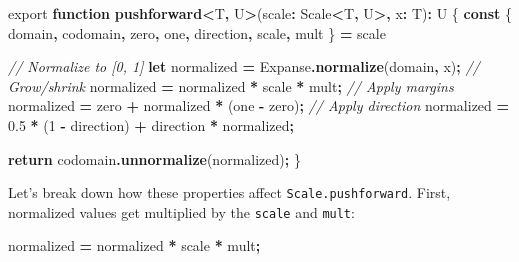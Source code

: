 \documentclass[
  openany]{book}
\newenvironment{Shaded}{\begin{snugshade}}{\end{snugshade}}
\newcommand{\CommentTok}[1]{\textcolor[rgb]{0.56,0.35,0.01}{\textit{#1}}}
\newcommand{\ControlFlowTok}[1]{\textcolor[rgb]{0.13,0.29,0.53}{\textbf{#1}}}
\newcommand{\DecValTok}[1]{\textcolor[rgb]{0.00,0.00,0.81}{#1}}
\newcommand{\FloatTok}[1]{\textcolor[rgb]{0.00,0.00,0.81}{#1}}
\newcommand{\FunctionTok}[1]{\textcolor[rgb]{0.13,0.29,0.53}{\textbf{#1}}}
\newcommand{\ImportTok}[1]{#1}
\newcommand{\KeywordTok}[1]{\textcolor[rgb]{0.13,0.29,0.53}{\textbf{#1}}}
\newcommand{\NormalTok}[1]{#1}
\newcommand{\OperatorTok}[1]{\textcolor[rgb]{0.81,0.36,0.00}{\textbf{#1}}}
\theoremstyle{definition}
\theoremstyle{definition}
\theoremstyle{definition}
\theoremstyle{definition}
\theoremstyle{remark}
\begin{document}
\begin{Shaded}
\begin{Highlighting}[]
\ImportTok{export} \KeywordTok{function} \FunctionTok{pushforward}\OperatorTok{\textless{}}\NormalTok{T}\OperatorTok{,}\NormalTok{ U}\OperatorTok{\textgreater{}}\NormalTok{(scale}\OperatorTok{:}\NormalTok{ Scale}\OperatorTok{\textless{}}\NormalTok{T}\OperatorTok{,}\NormalTok{ U}\OperatorTok{\textgreater{},}\NormalTok{ x}\OperatorTok{:}\NormalTok{ T)}\OperatorTok{:}\NormalTok{ U \{}
  \KeywordTok{const}\NormalTok{ \{ domain}\OperatorTok{,}\NormalTok{ codomain}\OperatorTok{,}\NormalTok{ zero}\OperatorTok{,}\NormalTok{ one}\OperatorTok{,}\NormalTok{ direction}\OperatorTok{,}\NormalTok{ scale}\OperatorTok{,}\NormalTok{ mult \} }\OperatorTok{=}\NormalTok{ scale}
  
  \CommentTok{// Normalize to [0, 1]}
  \KeywordTok{let}\NormalTok{ normalized }\OperatorTok{=}\NormalTok{ Expanse}\OperatorTok{.}\FunctionTok{normalize}\NormalTok{(domain}\OperatorTok{,}\NormalTok{ x)}\OperatorTok{;}  
  \CommentTok{// Grow/shrink}
\NormalTok{  normalized }\OperatorTok{=}\NormalTok{ normalized }\OperatorTok{*}\NormalTok{ scale }\OperatorTok{*}\NormalTok{ mult}\OperatorTok{;}         
  \CommentTok{// Apply margins}
\NormalTok{  normalized }\OperatorTok{=}\NormalTok{ zero }\OperatorTok{+}\NormalTok{ normalized }\OperatorTok{*}\NormalTok{ (one }\OperatorTok{{-}}\NormalTok{ zero)}\OperatorTok{;}  
  \CommentTok{// Apply direction}
\NormalTok{  normalized }\OperatorTok{=} \FloatTok{0.5} \OperatorTok{*}\NormalTok{ (}\DecValTok{1} \OperatorTok{{-}}\NormalTok{ direction) }\OperatorTok{+}\NormalTok{ direction }\OperatorTok{*}\NormalTok{ normalized}\OperatorTok{;}  
  
  \ControlFlowTok{return}\NormalTok{ codomain}\OperatorTok{.}\FunctionTok{unnormalize}\NormalTok{(normalized)}\OperatorTok{;}
\NormalTok{\}}
\end{Highlighting}
\end{Shaded}

Let's break down how these properties affect \texttt{Scale.pushforward}. First, normalized values get multiplied by the \texttt{scale} and \texttt{mult}:

\begin{Shaded}
\begin{Highlighting}[]
\NormalTok{normalized }\OperatorTok{=}\NormalTok{ normalized }\OperatorTok{*}\NormalTok{ scale }\OperatorTok{*}\NormalTok{ mult}\OperatorTok{;}
\end{Highlighting}
\end{Shaded}
\end{document}
